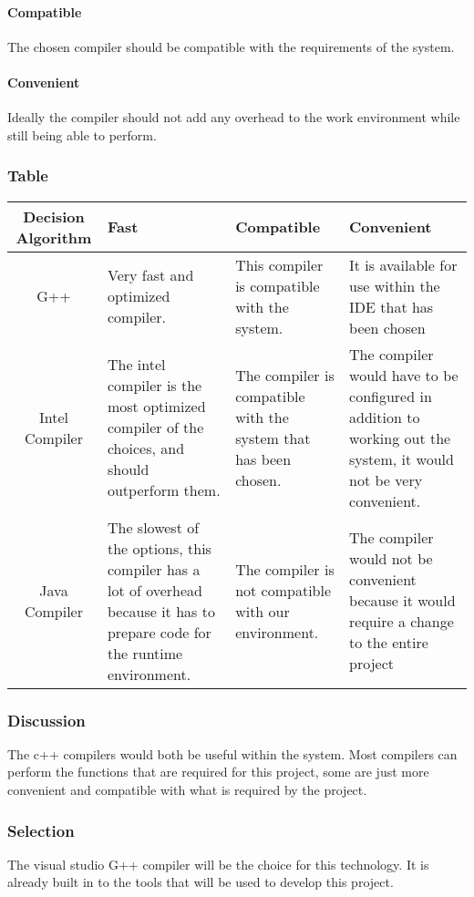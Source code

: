 \documentclass[10pt,letterpaper,onecolumn,draftclsnofoot]{IEEEtran}
\begin{document}
\paragraph{Compatible}
The chosen compiler should be compatible with the requirements of the system.
\paragraph{Convenient}
Ideally the compiler should not add any overhead to the work environment while still being able to perform.
\subsubsection{Table}
\begin{center}
	\begin{tabular}{ ||C|M|M|M|| } 
		\hline
		Decision Algorithm & Fast & Compatible & Convenient \\
		\hline
		G++ & Very fast and optimized compiler. & This compiler is compatible with the system. & It is available for use within the IDE that has been chosen \\ 
		\hline
		Intel Compiler & The intel compiler is the most optimized compiler of the choices, and should outperform them. & The compiler is compatible with the system that has been chosen. & The compiler would have to be configured in addition to working out the system, it would not be very convenient. \\ 
		\hline
		Java Compiler & The slowest of the options, this compiler has a lot of overhead because it has to prepare code for the runtime environment. & The compiler is not compatible with our environment. & The compiler would not be convenient because it would require a change to the entire project \\ 
		\hline
	\end{tabular}
\end{center}
\subsubsection{Discussion}
The c++ compilers would both be useful within the system. Most compilers can perform the functions that are required for this project, some are just more convenient and compatible with what is required by the project.
\subsubsection{Selection}
The visual studio G++ compiler will be the choice for this technology. It is already built in to the tools that will be used to develop this project.
\end{document}
